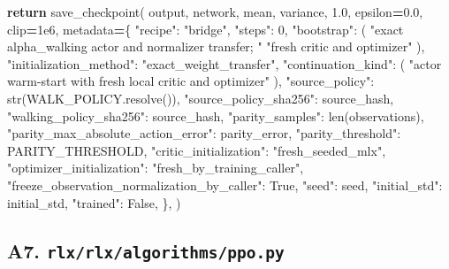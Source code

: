 \documentclass[
  chinese,
  11pt,
  letterpaper,
]{article}
\newenvironment{Shaded}{\begin{snugshade}}{\end{snugshade}}
\newcommand{\BuiltInTok}[1]{#1}
\newcommand{\ControlFlowTok}[1]{\textcolor[rgb]{0.13,0.29,0.53}{\textbf{#1}}}
\newcommand{\DecValTok}[1]{\textcolor[rgb]{0.00,0.00,0.81}{#1}}
\newcommand{\FloatTok}[1]{\textcolor[rgb]{0.00,0.00,0.81}{#1}}
\newcommand{\NormalTok}[1]{#1}
\newcommand{\OperatorTok}[1]{\textcolor[rgb]{0.81,0.36,0.00}{\textbf{#1}}}
\newcommand{\StringTok}[1]{\textcolor[rgb]{0.31,0.60,0.02}{#1}}
\newcommand{\VariableTok}[1]{\textcolor[rgb]{0.00,0.00,0.00}{#1}}
\renewenvironment{Shaded}{\par\smallskip}{\par\smallskip}
\begin{document}
\begin{Shaded}
\begin{Highlighting}[]
    \ControlFlowTok{return}\NormalTok{ save\_checkpoint(}
\NormalTok{        output,}
\NormalTok{        network,}
\NormalTok{        mean,}
\NormalTok{        variance,}
        \FloatTok{1.0}\NormalTok{,}
\NormalTok{        epsilon}\OperatorTok{=}\FloatTok{0.0}\NormalTok{,}
\NormalTok{        clip}\OperatorTok{=}\FloatTok{1e6}\NormalTok{,}
\NormalTok{        metadata}\OperatorTok{=}\NormalTok{\{}
            \StringTok{"recipe"}\NormalTok{: }\StringTok{"bridge"}\NormalTok{,}
            \StringTok{"steps"}\NormalTok{: }\DecValTok{0}\NormalTok{,}
            \StringTok{"bootstrap"}\NormalTok{: (}
                \StringTok{"exact alpha\_walking actor and normalizer transfer; "}
                \StringTok{"fresh critic and optimizer"}
\NormalTok{            ),}
            \StringTok{"initialization\_method"}\NormalTok{: }\StringTok{"exact\_weight\_transfer"}\NormalTok{,}
            \StringTok{"continuation\_kind"}\NormalTok{: (}
                \StringTok{"actor warm{-}start with fresh local critic and optimizer"}
\NormalTok{            ),}
            \StringTok{"source\_policy"}\NormalTok{: }\BuiltInTok{str}\NormalTok{(WALK\_POLICY.resolve()),}
            \StringTok{"source\_policy\_sha256"}\NormalTok{: source\_hash,}
            \StringTok{"walking\_policy\_sha256"}\NormalTok{: source\_hash,}
            \StringTok{"parity\_samples"}\NormalTok{: }\BuiltInTok{len}\NormalTok{(observations),}
            \StringTok{"parity\_max\_absolute\_action\_error"}\NormalTok{: parity\_error,}
            \StringTok{"parity\_threshold"}\NormalTok{: PARITY\_THRESHOLD,}
            \StringTok{"critic\_initialization"}\NormalTok{: }\StringTok{"fresh\_seeded\_mlx"}\NormalTok{,}
            \StringTok{"optimizer\_initialization"}\NormalTok{: }\StringTok{"fresh\_by\_training\_caller"}\NormalTok{,}
            \StringTok{"freeze\_observation\_normalization\_by\_caller"}\NormalTok{: }\VariableTok{True}\NormalTok{,}
            \StringTok{"seed"}\NormalTok{: seed,}
            \StringTok{"initial\_std"}\NormalTok{: initial\_std,}
            \StringTok{"trained"}\NormalTok{: }\VariableTok{False}\NormalTok{,}
\NormalTok{        \},}
\NormalTok{    )}
\end{Highlighting}
\end{Shaded}

\subsection{\texorpdfstring{A7.
\texttt{rlx/\allowbreak{}rlx/\allowbreak{}algorith\allowbreak{}ms/\allowbreak{}ppo.py}}{A7. }}\label{a7.-rlxrlxalgorithmsppo.py}
\end{document}
